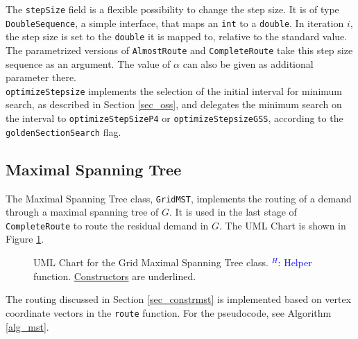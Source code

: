 The \texttt{stepSize} field is a flexible possibility to change the step size. It is of type \texttt{DoubleSequence}, a simple interface, that maps an \texttt{int} to a \texttt{double}. In iteration $i$, the step size is set to the \texttt{double} it is mapped to, relative to the standard value. The parametrized versions of \texttt{AlmostRoute} and \texttt{CompleteRoute} take this step size sequence as an argument. The value of $\alpha$ can also be given as additional parameter there.\\
\texttt{optimizeStepsize} implements the selection of the initial interval for minimum search, as described in Section \ref{sec_oss}, and delegates the minimum search on the interval to \texttt{optimizeStepSizeP4} or \texttt{optimizeStepsizeGSS}, according to the \texttt{goldenSectionSearch} flag.
\subsection{Maximal Spanning Tree}
The Maximal Spanning Tree class, \texttt{GridMST}, implements the routing of a demand through a maximal spanning tree of $G$. It is used in the last stage of \texttt{CompleteRoute} to route the residual demand in $G$. The UML Chart is shown in Figure \ref{class_mst}.
\begin{figure}
\caption{UML Chart for the Grid Maximal Spanning Tree class. \textcolor{blue}{$ ^H$: Helper} function. \underline{Constructors} are underlined.}\label{class_mst}
\end{figure}
The routing discussed in Section \ref{sec_constrmst} is implemented based on vertex coordinate vectors in the \texttt{route} function. For the pseudocode, see Algorithm \ref{alg_mst}.\\
